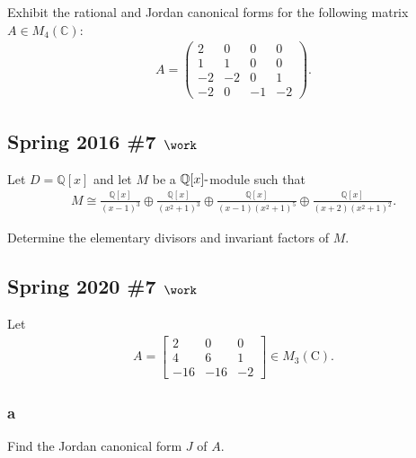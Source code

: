 Exhibit the rational and Jordan canonical forms for the following matrix
\(A\in M_4({\mathbb{C}})\):
\begin{align*}
  A=\left(\begin{array}{cccc}
  2 & 0 & 0 & 0 \\
  1 & 1 & 0 & 0 \\
  -2 & -2 & 0 & 1 \\
  -2 & 0 & -1 & -2
  \end{array}\right)
  .\end{align*}

\hypertarget{spring-2016-7-work}{%
\subsection{\texorpdfstring{Spring 2016 \#7
\(\work\)}{Spring 2016 \#7 \textbackslash work}}\label{spring-2016-7-work}}

Let \(D = {\mathbb{Q}}[x]\) and let \(M\) be a
\({\mathbb{Q}}[x]{\hbox{-}}\)module such that
\begin{align*}
M \cong \frac{\mathbb{Q}[x]}{(x-1)^{3}} \oplus \frac{\mathbb{Q}[x]}{\left(x^{2}+1\right)^{3}} \oplus \frac{\mathbb{Q}[x]}{(x-1)\left(x^{2}+1\right)^{5}} \oplus \frac{\mathbb{Q}[x]}{(x+2)\left(x^{2}+1\right)^{2}}
.\end{align*}

Determine the elementary divisors and invariant factors of \(M\).

\hypertarget{spring-2020-7-work}{%
\subsection{\texorpdfstring{Spring 2020 \#7
\(\work\)}{Spring 2020 \#7 \textbackslash work}}\label{spring-2020-7-work}}

Let
\begin{align*}
A=\left[\begin{array}{ccc}
2 & 0 & 0 \\
4 & 6 & 1 \\
-16 & -16 & -2
\end{array}\right] \in M_{3}(\mathrm{C})
.\end{align*}

\hypertarget{a-109}{%
\subsubsection{a}\label{a-109}}

Find the Jordan canonical form \(J\) of \(A\).

